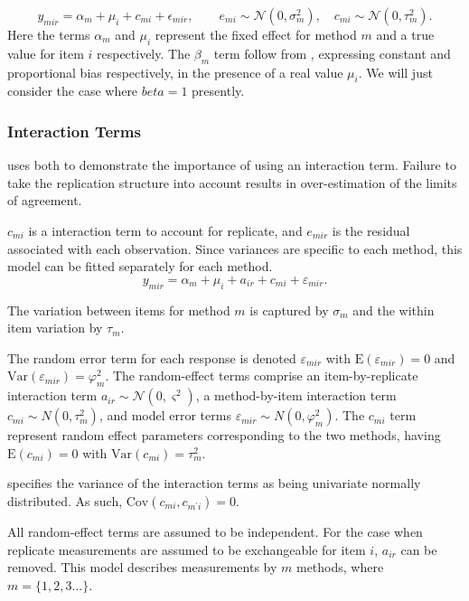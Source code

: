 \documentclass[12pt, a4paper]{report}
\theoremstyle{plain}
\theoremstyle{definition}
\theoremstyle{remark}
\begin{document}
\begin{equation}
y_{mir}  = \alpha_{m} + \mu_{i} + c_{mi} + \epsilon_{mir}, \qquad  e_{mi}
\sim \mathcal{N}(0,\sigma^{2}_{m}), \quad c_{mi} \sim \mathcal{N}(0,\tau^{2}_{m}).
\end{equation}
Here the terms $\alpha_{m}$ and $\mu_{i}$ represent the fixed effect for method $m$ and a true value for item $i$ respectively. The $\beta_{m}$ term follow from \citet{DunnSEME}, expressing constant and proportional bias respectively, in the presence of a real value $\mu_{i}.$ We will just consider the case where $beta=1$ presently. 

\subsubsection*{Interaction Terms}
\citet{BXC2008} uses both to demonstrate the importance of using an interaction term. Failure to take the replication structure into account results in over-estimation of the limits of agreement.

$c_{mi}$ is a interaction term to account for replicate, and $e_{mir}$ is the residual associated with each observation. Since variances are specific to each method, this model can be fitted separately for each method.
\begin{equation}\label{BXC-model}
y_{mir}  = \alpha_{m} + \mu_{i} + a_{ir} + c_{mi} + \varepsilon_{mir}.
\end{equation}


The variation between items for method $m$ is captured by $\sigma_m$ and the within item variation by $\tau_m$.

The random error term for each response is denoted $\varepsilon_{mir}$ with $\mathrm{E}(\varepsilon_{mir})=0$ and $\mathrm{Var}(\varepsilon_{mir})=\varphi^2_m$. 
The random-effect terms comprise an item-by-replicate interaction term $a_{ir} \sim \mathcal{N}(0,\varsigma^{2})$, a method-by-item interaction term $c_{mi} \sim N(0,\tau^{2}_{m})$, and model error terms $\varepsilon_{mir} \sim N(0,\varphi^{2}_{m})$. The $c_{mi}$ term represent random effect parameters corresponding to the two methods, having $\mathrm{E}(c_{mi})= 0$ with $\mathrm{Var}(c_{mi})=\tau^2_m$. 

\citet{BXC2008} specifies the variance of the interaction terms as being univariate normally distributed. As such, $\mathrm{Cov}(c_{mi}, c_{m^\prime i})= 0.$ 

All random-effect terms are assumed to be independent. For the case when replicate measurements are assumed to be exchangeable for item $i$, $a_{ir}$ can be removed. This model describes measurements by $m$ methods, where $m = \{1,2,3\ldots\}$. 
\end{document}
